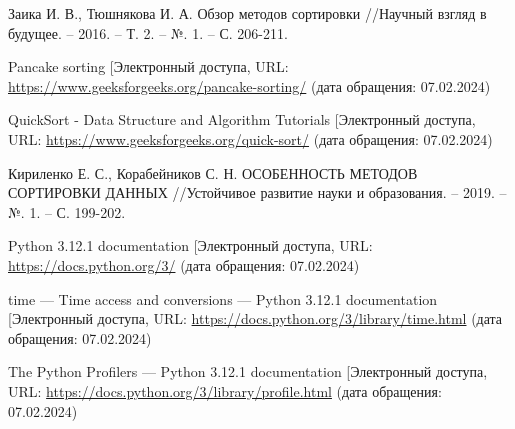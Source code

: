 \renewcommand\bibname{\centerline{СПИСОК ИСПОЛЬЗОВАННЫХ ИСТОЧНИКОВ}}

\begin{thebibliography}{3}
	\makeatletter
	\def\@biblabel#1{#1. }
	
	Заика И. В., Тюшнякова И. А. Обзор методов сортировки //Научный взгляд в будущее. – 2016. – Т. 2. – №. 1. – С. 206-211.
	
	Pancake sorting [Электронный \text{ресурс]. -- Режим} доступа, URL: \url{https://www.geeksforgeeks.org/pancake-sorting/} (дата обращения: 07.02.2024)
	
	QuickSort - Data Structure and Algorithm Tutorials [Электронный \text{ресурс]. -- Режим} доступа, URL: \url{https://www.geeksforgeeks.org/quick-sort/} (дата обращения: 07.02.2024)
	
	Кириленко Е. С., Корабейников С. Н. ОСОБЕННОСТЬ МЕТОДОВ СОРТИРОВКИ ДАННЫХ //Устойчивое развитие науки и образования. – 2019. – №. 1. – С. 199-202.
	
	Python 3.12.1 documentation [Электронный \text{ресурс]. -- Режим} доступа, URL: \url{https://docs.python.org/3/} (дата обращения: 07.02.2024)

	time — Time access and conversions — Python 3.12.1 documentation [Электронный \text{ресурс]. -- Режим} доступа, URL: \url{https://docs.python.org/3/library/time.html} (дата обращения: 07.02.2024)
	
	The Python Profilers — Python 3.12.1 documentation [Электронный \text{ресурс]. -- Режим} доступа, URL: \url{https://docs.python.org/3/library/profile.html} (дата обращения: 07.02.2024)
\end{thebibliography}